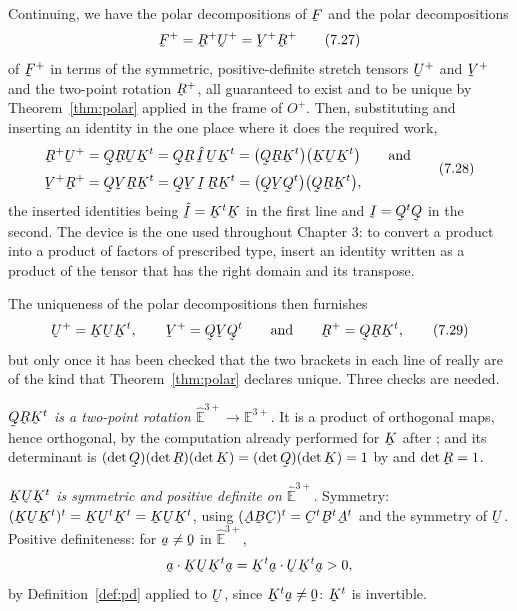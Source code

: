Continuing, we have the polar decompositions  of $\bF$ and the
polar decompositions
\begin{equation}
   \bF^{+}=\bR^{+}\bU^{+}=\bV^{+}\bR^{+}
   \tag{7.27}\label{eq:7.27}
\end{equation}
of $\bF^{+}$ in terms of the symmetric, positive-definite stretch tensors
$\bU^{+}$ and $\bV^{+}$ and the two-point rotation $\bR^{+}$, all
guaranteed to exist and to be unique by Theorem~\ref{thm:polar} applied
in the frame of $O^{+}$. Then, substituting  and inserting an
identity in the one place where it does the required work,
\begin{equation}
\begin{aligned}
   \bR^{+}\bU^{+}&=\bQ\bR\bU\bK^{t}=\bQ\bR\,\hI\,\bU\bK^{t}
     =\big(\bQ\bR\bK^{t}\big)\big(\bK\bU\bK^{t}\big)
   \qquad\text{and}\\[1mm]
   \bV^{+}\bR^{+}&=\bQ\bV\bR\bK^{t}=\bQ\bV\,\I\,\bR\bK^{t}
     =\big(\bQ\bV\bQ^{t}\big)\big(\bQ\bR\bK^{t}\big),
\end{aligned}
   \tag{7.28}\label{eq:7.28}
\end{equation}
the inserted identities being $\hI=\bK^{t}\bK$ in the first line and
$\I=\bQ^{t}\bQ$ in the second. The device is the one used throughout
Chapter 3: to convert a product into a product of factors of prescribed
type, insert an identity written as a product of the tensor that has the
right domain and its transpose.

The uniqueness of the polar decompositions then furnishes
\begin{equation}
   \bU^{+}=\bK\bU\bK^{t},\qquad
   \bV^{+}=\bQ\bV\bQ^{t}
   \qquad\text{and}\qquad
   \bR^{+}=\bQ\bR\bK^{t},
   \tag{7.29}\label{eq:7.29}
\end{equation}
but only once it has been checked that the two brackets in each line of
 really are of the kind that Theorem~\ref{thm:polar} declares
unique. Three checks are needed.

\emph{$\bQ\bR\bK^{t}$ is a two-point rotation
$\hat{\mathbb{E}}^{3+}\to\mathbb{E}^{3+}$.} It is a product of orthogonal
maps, hence orthogonal, by the computation already performed for $\bK$
after ; and its determinant is
$(\det\bQ)(\det\bR)(\det\bK)=(\det\bQ)(\det\bK)=1$ by  and
$\det\bR=1$.

\emph{$\bK\bU\bK^{t}$ is symmetric and positive definite on
$\hat{\mathbb{E}}^{3+}$.} Symmetry:
$(\bK\bU\bK^{t})^{t}=\bK\bU^{t}\bK^{t}=\bK\bU\bK^{t}$, using
$(\bA\bB\bC)^{t}=\bC^{t}\bB^{t}\bA^{t}$ and the symmetry of $\bU$.
Positive definiteness: for $\ba\neq\bze$ in $\hat{\mathbb{E}}^{3+}$,
\[
   \ip\ba{\bK\bU\bK^{t}\ba}=\ip{\bK^{t}\ba}{\bU\bK^{t}\ba}>0 ,
\]
by Definition~\ref{def:pd} applied to $\bU$, since $\bK^{t}\ba\neq\bze$:
$\bK^{t}$ is invertible.

